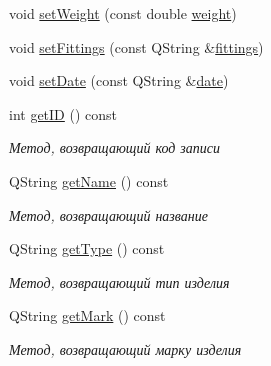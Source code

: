 \begin{DoxyCompactItemize}
\item 
void \mbox{\hyperlink{class_data_aff251e538fd90632b197cd3e1de14937}{set\+Weight}} (const double \mbox{\hyperlink{class_data_a6c25bf523edd42b47dd8495307273594}{weight}})
\item 
void \mbox{\hyperlink{class_data_a091525ef3fbe398be05227836db730eb}{set\+Fittings}} (const Q\+String \&\mbox{\hyperlink{class_data_a4d9e20ab733af7e52714c7e817c8f69c}{fittings}})
\item 
void \mbox{\hyperlink{class_data_a8b89370bb424c114f707ae6d6a7ae807}{set\+Date}} (const Q\+String \&\mbox{\hyperlink{class_data_ab4fdaff8b80270296a56be3702b5260d}{date}})
\item 
\mbox{\label{class_data_a7dc3b10c363a06909766ab4fac9410c8}} 
int \mbox{\hyperlink{class_data_a7dc3b10c363a06909766ab4fac9410c8}{get\+ID}} () const
\begin{DoxyCompactList}\small\item\em Метод, возвращающий код записи \end{DoxyCompactList}\item 
\mbox{\label{class_data_a5c9c3c6479381c7265755d4b0156d0cc}} 
Q\+String \mbox{\hyperlink{class_data_a5c9c3c6479381c7265755d4b0156d0cc}{get\+Name}} () const
\begin{DoxyCompactList}\small\item\em Метод, возвращающий название \end{DoxyCompactList}\item 
\mbox{\label{class_data_adaf8a335c3d22b92841c3447b329c7c2}} 
Q\+String \mbox{\hyperlink{class_data_adaf8a335c3d22b92841c3447b329c7c2}{get\+Type}} () const
\begin{DoxyCompactList}\small\item\em Метод, возвращающий тип изделия \end{DoxyCompactList}\item 
\mbox{\label{class_data_a7cfad1bc3806da5e226fa35e43e32266}} 
Q\+String \mbox{\hyperlink{class_data_a7cfad1bc3806da5e226fa35e43e32266}{get\+Mark}} () const
\begin{DoxyCompactList}\small\item\em Метод, возвращающий марку изделия \end{DoxyCompactList}\item 
\mbox{\label{class_data_a2c645813f887202f6496656db444dfa8}} 

\end{DoxyCompactItemize}
